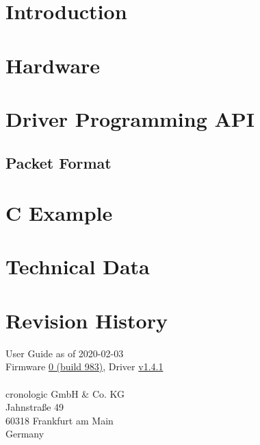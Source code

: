\documentclass[11pt,notitlepage]{scrreprt}
\newcommand{\ttinput}[1]{}
\newcommand{\ttinput}[1]{}
\begin{document}
 
%
	\chapter{Introduction}
		\ttinput{Intro.tex}
	\chapter{Hardware}
		
		
	\chapter{Driver Programming API} 
		
	\section{Packet Format\label{cp:packetformat}}
		
	\chapter{C Example} 
		
	\chapter{Technical Data}  
		
		\newpage
		
	\chapter{Revision History}
		\noindent
		User Guide \hyperlink{ugrev}{\ugrev} as of 2020-02-03\\
		Firmware \hyperlink{fwrev}{0 (build 983)}, Driver \hyperlink{drvrev}{v1.4.1}\\
		\\
		cronologic GmbH \& Co. KG\\
		Jahnstraße 49\\
		60318 Frankfurt am Main\\Germany\\
		
		
		
\end{document}
